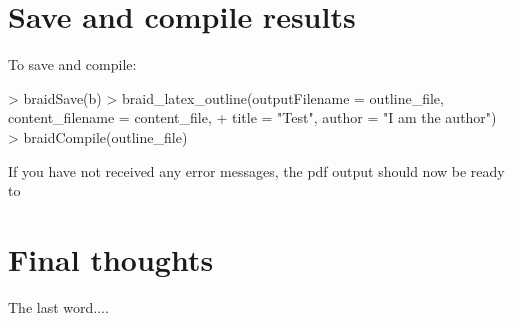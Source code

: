 \documentclass[a4paper]{article}
\begin{document}
\section{Save and compile results}

To save and compile:

\begin{Schunk}
\begin{Sinput}
> braidSave(b)
> braid_latex_outline(outputFilename = outline_file, content_filename = content_file, 
+     title = "Test", author = "I am the author")
> braidCompile(outline_file)
\end{Sinput}
\end{Schunk}

If you have not received any error messages, the pdf output should now be ready to 


\section{Final thoughts}

The last word....


\end{document}
